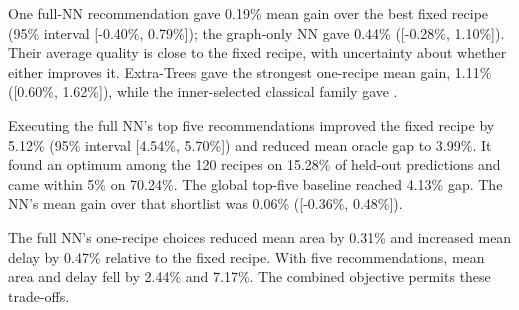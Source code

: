 One full-NN recommendation gave 0.19\% mean gain over the best fixed recipe (95\% interval [-0.40\%, 0.79\%]); the graph-only NN gave 0.44\% ([-0.28\%, 1.10\%]). Their average quality is close to the fixed recipe, with uncertainty about whether either improves it. Extra-Trees gave the strongest one-recipe mean gain, 1.11\% ([0.60\%, 1.62\%]), while the inner-selected classical family gave \PrimaryGain.

Executing the full NN's top five recommendations improved the fixed recipe by 5.12\% (95\% interval [4.54\%, 5.70\%]) and reduced mean oracle gap to 3.99\%. It found an optimum among the 120 recipes on 15.28\% of held-out predictions and came within 5\% on 70.24\%. The global top-five baseline reached 4.13\% gap. The NN's mean gain over that shortlist was 0.06\% ([-0.36\%, 0.48\%]).

The full NN's one-recipe choices reduced mean area by 0.31\% and increased mean delay by 0.47\% relative to the fixed recipe. With five recommendations, mean area and delay fell by 2.44\% and 7.17\%. The combined objective permits these trade-offs.
